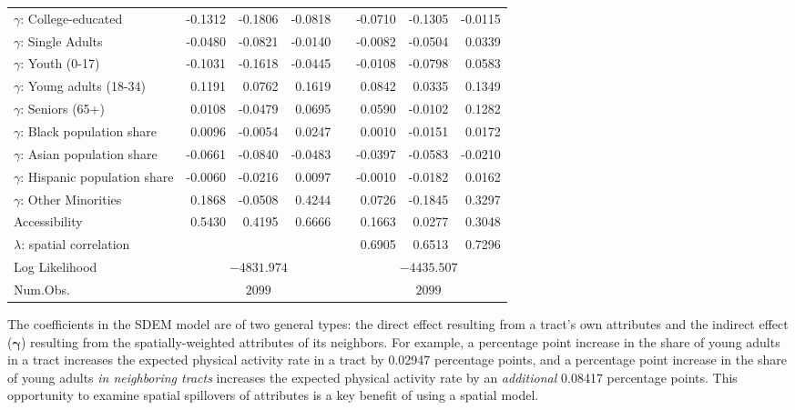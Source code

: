 \documentclass[shortAfour,sageh.bst]{sagej}
\begin{document}
\begin{table*}
\begin{tabular}{l d{2.4} d{2.4} d{2.4} c d{2.4} d{2.4} d{2.4} }
  $\gamma$: College-educated & -0.1312 & -0.1806 & -0.0818 &   & -0.0710 & -0.1305 & -0.0115 \\ 
  $\gamma$: Single Adults & -0.0480 & -0.0821 & -0.0140 &   & -0.0082 & -0.0504 & 0.0339 \\ 
  $\gamma$: Youth (0-17) & -0.1031 & -0.1618 & -0.0445 &   & -0.0108 & -0.0798 & 0.0583 \\ 
  $\gamma$: Young adults (18-34) & 0.1191 & 0.0762 & 0.1619 &   & 0.0842 & 0.0335 & 0.1349 \\ 
  $\gamma$: Seniors (65+) & 0.0108 & -0.0479 & 0.0695 &   & 0.0590 & -0.0102 & 0.1282 \\ 
  $\gamma$: Black population share & 0.0096 & -0.0054 & 0.0247 &   & 0.0010 & -0.0151 & 0.0172 \\ 
  $\gamma$: Asian population share & -0.0661 & -0.0840 & -0.0483 &   & -0.0397 & -0.0583 & -0.0210 \\ 
  $\gamma$: Hispanic population share & -0.0060 & -0.0216 & 0.0097 &   & -0.0010 & -0.0182 & 0.0162 \\ 
  $\gamma$: Other Minorities & 0.1868 & -0.0508 & 0.4244 &   & 0.0726 & -0.1845 & 0.3297 \\ 
  Accessibility & 0.5430 & 0.4195 & 0.6666 &   & 0.1663 & 0.0277 & 0.3048 \\ 
  $\lambda$: spatial correlation &  &  &  &   & 0.6905 & 0.6513 & 0.7296 \\ 
  
\midrule
Log Likelihood &  & & \\
Num.Obs.       &    & & \\
\bottomrule
\end{tabular}
\end{table*}

The coefficients in the SDEM model are of two general types: the direct
effect resulting from a tract's own attributes and the indirect effect
(\(\boldsymbol{\gamma}\)) resulting from the spatially-weighted
attributes of its neighbors. For example, a percentage point increase in
the share of young adults in a tract increases the expected physical
activity rate in a tract by 0.02947 percentage points, and a percentage
point increase in the share of young adults \emph{in neighboring tracts}
increases the expected physical activity rate by an \emph{additional}
0.08417 percentage points. This opportunity to examine spatial
spillovers of attributes is a key benefit of using a spatial model.
\end{document}
